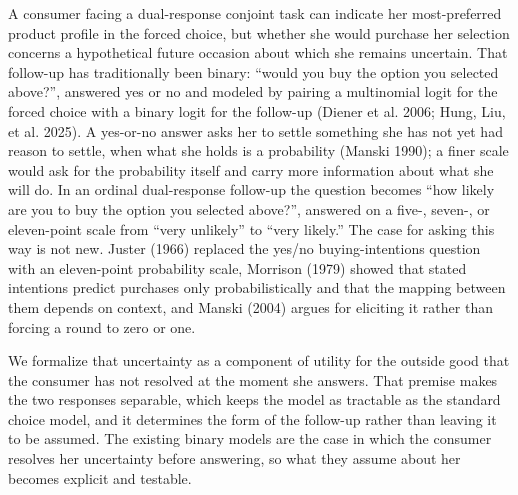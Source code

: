 \documentclass[
  letterpaper,
  DIV=11,
  numbers=noendperiod]{scrartcl}
\theoremstyle{plain}
\theoremstyle{plain}
\theoremstyle{plain}
\theoremstyle{remark}
\begin{document}
A consumer facing a dual-response conjoint task can indicate her
most-preferred product profile in the forced choice, but whether she
would purchase her selection concerns a hypothetical future occasion
about which she remains uncertain. That follow-up has traditionally been
binary: ``would you buy the option you selected above?'', answered yes
or no and modeled by pairing a multinomial logit for the forced choice
with a binary logit for the follow-up (Diener et al. 2006; Hung, Liu, et
al. 2025). A yes-or-no answer asks her to settle something she has not
yet had reason to settle, when what she holds is a probability (Manski
1990); a finer scale would ask for the probability itself and carry more
information about what she will do. In an ordinal dual-response
follow-up the question becomes ``how likely are you to buy the option
you selected above?'', answered on a five-, seven-, or eleven-point
scale from ``very unlikely'' to ``very likely.'' The case for asking
this way is not new. Juster (1966) replaced the yes/no buying-intentions
question with an eleven-point probability scale, Morrison (1979) showed
that stated intentions predict purchases only probabilistically and that
the mapping between them depends on context, and Manski (2004) argues
for eliciting it rather than forcing a round to zero or one.

We formalize that uncertainty as a component of utility for the outside
good that the consumer has not resolved at the moment she answers. That
premise makes the two responses separable, which keeps the model as
tractable as the standard choice model, and it determines the form of
the follow-up rather than leaving it to be assumed. The existing binary
models are the case in which the consumer resolves her uncertainty
before answering, so what they assume about her becomes explicit and
testable.
\end{document}
